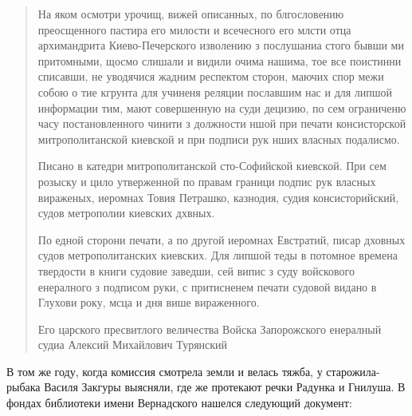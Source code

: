 \begin{quotation}
На яком осмотри урочищ, вижей описанных, по блгословению преосщенного пастира его милости и всечесного его млсти отца архимандрита Киево-Печерского изволению з послушаниа стого бывши ми притомными, щосмо слишали и видили очима нашима, тое все поистинни списавши, не уводячися жадним респектом сторон, маючих спор межи собою о тие кгрунта для учиненя реляции пославшим нас и для липшой информации тим, мают совершенную на суди децизию, по сем ограниченю часу постановленного чинити з должности ншой при печати консисторской митрополитанской киевской и при подписи рук нших власных подалисмо. 

Писано в катедри митрополитанской сто-Со\-фийс\-кой киевской. При сем розыску и цило утверженной по правам граници подпис рук власных вираженых, иеромнах Товия Петрашко, казнодия, судия консисторийский, судов метрополии киевских дхвных. 

По едной сторони печати, а по другой иеромнах Евстратий, писар дховных судов метрополитанских киевских. Для липшой теды в потомное времена твердости в книги судовие заведши, сей випис з суду войскового енералного з подписом руки, с притисненем печати судовой видано в Глухови року, мсца и дня више вираженного.

Его царского пресвитлого величества Войска Запорожского енералный судиа Алексий Михайлович Турянский
\end{quotation}

В том же году, когда комиссия смотрела земли и велась тяжба, у старожила-рыбака Василя Закгуры выясняли, где же протекают речки Радунка и Гнилуша. В фондах библиотеки имени Вернадского нашелся следующий документ\cite{mihdocs}:

